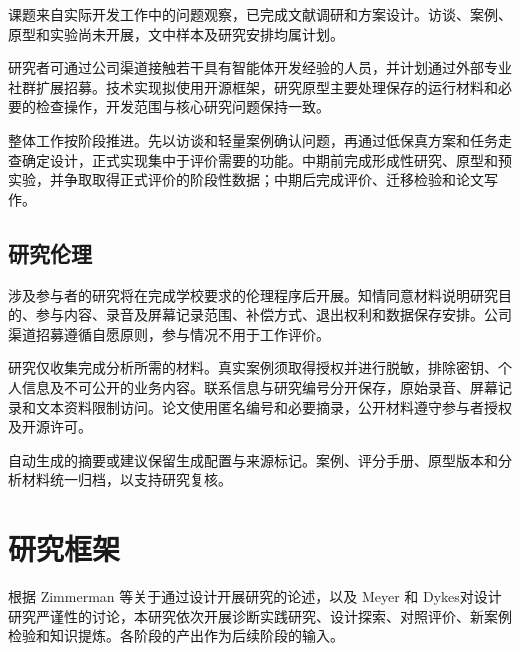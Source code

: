 课题来自实际开发工作中的问题观察，已完成文献调研和方案设计。访谈、案例、原型和实验尚未开展，文中样本及研究安排均属计划。

研究者可通过公司渠道接触若干具有智能体开发经验的人员，并计划通过外部专业社群扩展招募。技术实现拟使用开源框架，研究原型主要处理保存的运行材料和必要的检查操作，开发范围与核心研究问题保持一致。

整体工作按阶段推进。先以访谈和轻量案例确认问题，再通过低保真方案和任务走查确定设计，正式实现集中于评价需要的功能。中期前完成形成性研究、原型和预实验，并争取取得正式评价的阶段性数据；中期后完成评价、迁移检验和论文写作。

\subsection{研究伦理}

涉及参与者的研究将在完成学校要求的伦理程序后开展。知情同意材料说明研究目的、参与内容、录音及屏幕记录范围、补偿方式、退出权利和数据保存安排。公司渠道招募遵循自愿原则，参与情况不用于工作评价。

研究仅收集完成分析所需的材料。真实案例须取得授权并进行脱敏，排除密钥、个人信息及不可公开的业务内容。联系信息与研究编号分开保存，原始录音、屏幕记录和文本资料限制访问。论文使用匿名编号和必要摘录，公开材料遵守参与者授权及开源许可。

自动生成的摘要或建议保留生成配置与来源标记。案例、评分手册、原型版本和分析材料统一归档，以支持研究复核。

\section{研究框架}

根据 Zimmerman 等\cite{zimmerman2007rtd}关于通过设计开展研究的论述，以及 Meyer 和 Dykes\cite{meyer2020rigor}对设计研究严谨性的讨论，本研究依次开展诊断实践研究、设计探索、对照评价、新案例检验和知识提炼。各阶段的产出作为后续阶段的输入。

